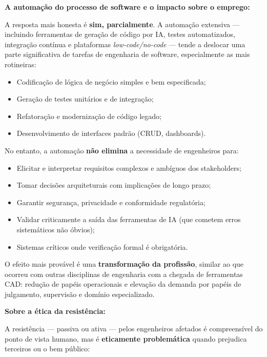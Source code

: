 \documentclass[12pt,a4paper]{article}
\begin{document}
\begin{resposta}

\textbf{A automação do processo de software e o impacto sobre o emprego:}

A resposta mais honesta é \textbf{sim, parcialmente}. A automação extensiva ---
incluindo ferramentas de geração de código por IA, testes automatizados,
integração contínua e plataformas \textit{low-code/no-code} --- tende a
deslocar uma parte significativa de tarefas de engenharia de software,
especialmente as mais rotineiras:

\begin{itemize}[nosep]
  \item Codificação de lógica de negócio simples e bem especificada;
  \item Geração de testes unitários e de integração;
  \item Refatoração e modernização de código legado;
  \item Desenvolvimento de interfaces padrão (CRUD, dashboards).
\end{itemize}

No entanto, a automação \textbf{não elimina} a necessidade de engenheiros para:
\begin{itemize}[nosep]
  \item Elicitar e interpretar requisitos complexos e ambíguos dos stakeholders;
  \item Tomar decisões arquiteturais com implicações de longo prazo;
  \item Garantir segurança, privacidade e conformidade regulatória;
  \item Validar criticamente a saída das ferramentas de IA (que cometem erros
        sistemáticos não óbvios);
  \item Sistemas críticos onde verificação formal é obrigatória.
\end{itemize}

O efeito mais provável é uma \textbf{transformação da profissão}, similar ao que
ocorreu com outras disciplinas de engenharia com a chegada de ferramentas CAD:
redução de papéis operacionais e elevação da demanda por papéis de julgamento,
supervisão e domínio especializado.

\textbf{Sobre a ética da resistência:}

A resistência --- passiva ou ativa --- pelos engenheiros afetados é compreensível
do ponto de vista humano, mas é \textbf{eticamente problemática} quando prejudica
terceiros ou o bem público:


\end{resposta}
\end{document}
